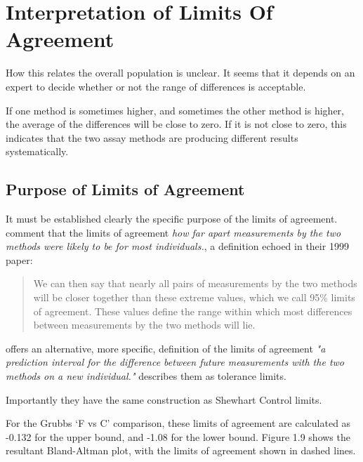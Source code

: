\documentclass[12pt, a4paper]{report}
\theoremstyle{plain}
\theoremstyle{definition}
\theoremstyle{remark}
\begin{document}
\section{Interpretation of Limits Of Agreement}

How this relates the overall population is unclear. It seems that it depends on an expert to decide whether or not the range of differences is acceptable. 

If one method is sometimes higher, and sometimes the other method is higher, the average of the differences will be close to zero. If it is not close to zero, this indicates that the two assay methods are producing different results systematically.


\subsection{Purpose of Limits of Agreement} It must be established
clearly the specific purpose of the limits of agreement.
\citet*{BA95} comment that the limits of agreement \emph{how far
	apart measurements by the two methods were likely to be for most
	individuals.}, a definition echoed in their 1999 paper:
\begin{quote} We can then say that nearly all pairs
	of measurements by the two methods will be closer together than
	these extreme values, which we call 95\% limits of agreement.
	These values define the range within which most differences
	between measurements by the two methods will lie\citep{BA99}.
\end{quote}
\citet{BXC} offers an alternative, more specific,  definition of
the limits of agreement \emph{"a prediction interval for the
	difference between future measurements with the two methods on a
	new individual."} \citet{luiz} describes them as tolerance limits.

Importantly they have the same construction as Shewhart Control
limits.



For the Grubbs `F vs C' comparison, these limits
of agreement are calculated as -0.132 for the upper bound, and
-1.08 for the lower bound. Figure 1.9 shows the resultant
Bland-Altman plot, with the limits of agreement shown in dashed
lines.
\end{document}

